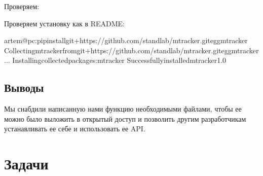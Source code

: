 \documentclass[letterpaper,10pt,russian]{sphinxmanual}
\begin{document}
\sphinxAtStartPar
Проверяем:

\begin{sphinxVerbatim}[commandchars=\\\{\}]
   
\end{sphinxVerbatim}

\sphinxAtStartPar
Проверяем установку как в README:

\begin{sphinxVerbatim}[commandchars=\\\{\}]
artem@pc:\PYGZti{}\PYGZdl{}pipinstallgit+https://github.com/standlab/mtracker.git\PYGZsh{}eggmtracker
Collectingmtrackerfromgit+https://github.com/standlab/mtracker.git\PYGZsh{}eggmtracker
...
Installingcollectedpackages:mtracker
Successfullyinstalledmtracker\PYGZhy{}1.0
\end{sphinxVerbatim}


\subsection{Выводы}
\label{\detokenize{educational_materials/code_to_lib/content:id5}}
\sphinxAtStartPar
Мы снабдили написанную нами функцию необходимыми файлами, чтобы ее можно было выложить в открытый доступ и позволить другим разработчикам устанавливать ее себе и использовать ее API.

\sphinxstepscope


\section{Задачи}
\label{\detokenize{educational_materials/code_to_lib/exercises:id1}}\label{\detokenize{educational_materials/code_to_lib/exercises::doc}}
\end{document}
